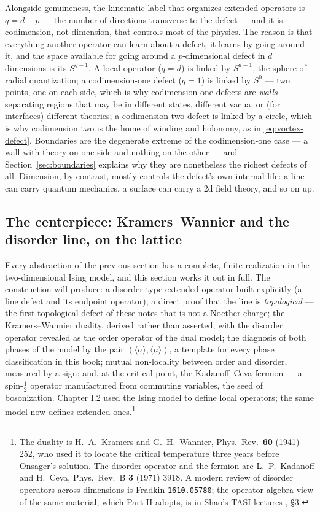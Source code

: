 Alongside genuineness, the kinematic label that organizes extended
operators is  $q = d - p$ --- the number of directions
transverse to the defect --- and it is codimension, not dimension, that
controls most of the physics. The reason is that everything another
operator can learn about a defect, it learns by going around it, and the
space available for going around a $p$-dimensional defect in $d$
dimensions is its  $S^{q-1}$. A local operator
($q = d$) is linked by $S^{d-1}$, the sphere of radial quantization; a
codimension-one defect ($q = 1$) is linked by $S^0$ --- two points, one
on each side, which is why codimension-one defects are \emph{walls}
separating regions that may be in different states, different vacua, or
(for interfaces) different theories; a codimension-two defect is linked
by a circle, which is why codimension two is the home of winding and
holonomy, as in \eqref{eq:vortex-defect}. Boundaries are the degenerate
extreme of the codimension-one case --- a wall with theory on one side
and nothing on the other --- and Section~\ref{sec:boundaries} explains
why they are nonetheless the richest defects of all. Dimension, by
contrast, mostly controls the defect's own internal life: a line can
carry quantum mechanics, a surface can carry a 2d field theory, and so
on up.

\subsection{The centerpiece: Kramers--Wannier and the disorder line, on the lattice}
\label{sec:kw-centerpiece}

Every abstraction of the previous section has a complete, finite
realization in the two-dimensional Ising model, and this section works it
out in full. The construction will produce: a disorder-type extended
operator built
explicitly (a line defect and its endpoint operator); a direct proof that
the line is \emph{topological} --- the first topological defect of these
notes that is not a Noether charge; the Kramers--Wannier duality, derived
rather than asserted, with the disorder operator revealed as the order
operator of the dual model; the diagnosis of both phases of the model by
the pair $(\langle\sigma\rangle, \langle\mu\rangle)$, a template for every
phase classification in this book; mutual non-locality between order and
disorder, measured by a sign; and, at the critical point, the
Kadanoff--Ceva fermion --- a spin-$\frac12$ operator manufactured from
commuting variables, the seed of bosonization. Chapter I.2 used the Ising
model to define local operators; the same model now defines extended
ones.\footnote{The duality is H.~A.~Kramers and G.~H.~Wannier, Phys.\
Rev.\ \textbf{60} (1941) 252, who used it to locate the critical
temperature three years before Onsager's solution. The disorder operator
and the fermion are L.~P.~Kadanoff and H.~Ceva, Phys.\ Rev.\ B \textbf{3}
(1971) 3918. A modern review of disorder operators across dimensions is
Fradkin \texttt{1610.05780}; the operator-algebra view of the same
material, which Part II adopts, is in Shao's TASI lectures
, \S3.}

